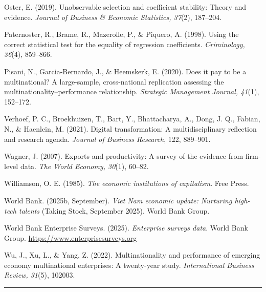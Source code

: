 \documentclass[
  a4paper,
  13pt]{extreport}
\begin{document}
Oster, E. (2019). Unobservable selection and coefficient stability:
Theory and evidence. \emph{Journal of Business \& Economic Statistics,
37}(2), 187--204.

Paternoster, R., Brame, R., Mazerolle, P., \& Piquero, A. (1998). Using
the correct statistical test for the equality of regression
coefficients. \emph{Criminology, 36}(4), 859--866.

Pisani, N., Garcia-Bernardo, J., \& Heemskerk, E. (2020). Does it pay to
be a multinational? A large-sample, cross-national replication assessing
the multinationality--performance relationship. \emph{Strategic
Management Journal, 41}(1), 152--172.

Verhoef, P. C., Broekhuizen, T., Bart, Y., Bhattacharya, A., Dong, J.
Q., Fabian, N., \& Haenlein, M. (2021). Digital transformation: A
multidisciplinary reflection and research agenda. \emph{Journal of
Business Research}, 122, 889--901.

Wagner, J. (2007). Exports and productivity: A survey of the evidence
from firm-level data. \emph{The World Economy, 30}(1), 60--82.

Williamson, O. E. (1985). \emph{The economic institutions of
capitalism}. Free Press.

World Bank. (2025b, September). \emph{Viet Nam economic update:
Nurturing high-tech talents} (Taking Stock, September 2025). World Bank
Group.

World Bank Enterprise Surveys. (2025). \emph{Enterprise surveys data}.
World Bank Group. \url{https://www.enterprisesurveys.org}

Wu, J., Xu, L., \& Yang, Z. (2022). Multinationality and performance of
emerging economy multinational enterprises: A twenty-year study.
\emph{International Business Review, 31}(5), 102003.

\begin{center}\rule{0.5\linewidth}{0.5pt}\end{center}
\end{document}
